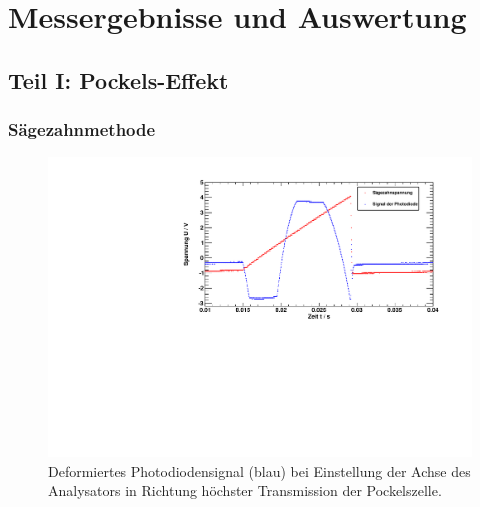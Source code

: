 \section{Messergebnisse und Auswertung}

\subsection{Teil I: Pockels-Effekt}

\subsubsection{Sägezahnmethode}

\begin{figure}[H]
\begin{center}
  \includegraphics[width=15cm]{../img/pock_saege_winkel0.pdf}
  \caption{Deformiertes Photodiodensignal (blau) bei Einstellung der Achse des Analysators in
  Richtung höchster Transmission der Pockelszelle.}
  \label{img:pock_saege_winkel0}
\end{center}
\end{figure}

